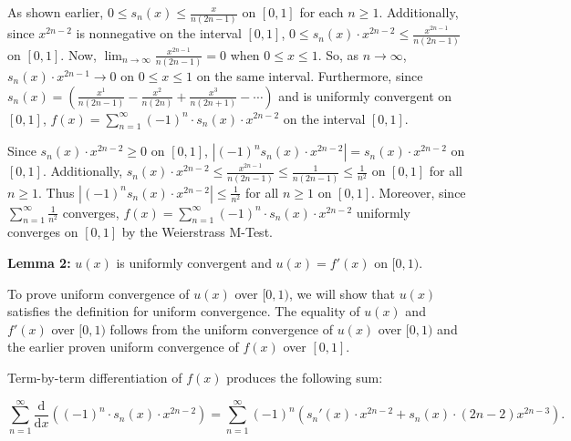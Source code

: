 \documentclass{article}
\begin{document}
\vspace{5mm}

As shown earlier, $0 \leq s_n(x) \leq \frac{x}{n(2n-1)}$ on $[0,1]$ for each $n \geq 1$. Additionally, since $x^{2n-2}$ is nonnegative on the interval $[0, 1]$, $0 \leq s_n(x)\cdot x^{2n-2} \le \frac{x^{2n-1}}{n(2n-1)}$ on $[0,1]$. Now, $\displaystyle \lim_{n \to \infty} \frac{x^{2n-1}}{n(2n-1)} = 0$ when $0 \leq x \leq 1$. So, as $n \to \infty$, $s_n(x)\cdot x^{2n-1} \to 0$ on $0 \leq x \le 1$ on the same interval. Furthermore, since $s_n(x) = \left(\frac{ x^{1}}{n(2n-1)}-\frac{x^{2}}{n(2n)}+\frac{x^{3}}{n(2n+1)}-\cdots\right)$ and is uniformly convergent on $[0, 1]$, $f(x) = \sum_{n=1}^{\infty}(-1)^n\cdot s_n(x)\cdot x^{2n-2}$ on the interval $[0,1]$.

\vspace{5mm}

Since $s_n(x)\cdot x^{2n-2} \ge 0$ on $[0, 1]$, $\left|(-1)^{n}s_n(x)\cdot x^{2n-2}\right|= s_n(x)\cdot x^{2n-2}$ on $[0,1]$. Additionally, $s_n(x)\cdot x^{2n-2} \le \frac{x^{2n-1}}{n(2n-1)}\le\frac{1}{n(2n-1)}\le\frac{1}{n^2}$ on $[0, 1]$ for all $n \ge 1$. Thus $\left|(-1)^{n}s_n(x)\cdot x^{2n-2}\right| \le \frac{1}{n^2}$ for all $n \ge 1$ on $[0,1]$. Moreover, since $\sum_{n=1}^{\infty}\frac{1}{n^2}$ converges, $f(x) = \sum_{n=1}^{\infty}(-1)^n\cdot s_n(x)\cdot x^{2n-2}$ uniformly converges on $[0, 1]$ by the Weierstrass M-Test.



\vspace{5mm}

\textbf{Lemma 2:} $u(x)$ is uniformly convergent and $u(x) = f'(x)$ on $[0, 1)$.

\vspace{5mm}

To prove uniform convergence of $u(x)$ over $[0, 1)$, we will show that $u(x)$ satisfies the definition for uniform convergence. The equality of $u(x)$ and $f'(x)$ over $[0,1)$ follows from the uniform convergence of $u(x)$ over $[0,1)$ and the earlier proven uniform convergence of $f(x)$ over $[0, 1]$.

\vspace{5mm}

Term-by-term differentiation of $f(x)$ produces the following sum:

\begin{equation*}
\sum_{n=1}^{\infty}\frac{\mathrm{d}}{\mathrm{d}x}\left((-1)^n\cdot s_n(x)\cdot x^{2n-2}\right)
=\sum_{n=1}^{\infty}(-1)^n(s_n'(x) \cdot x^{2n-2} + s_n(x) \cdot (2n-2)x^{2n-3}).
\end{equation*}
\end{document}
